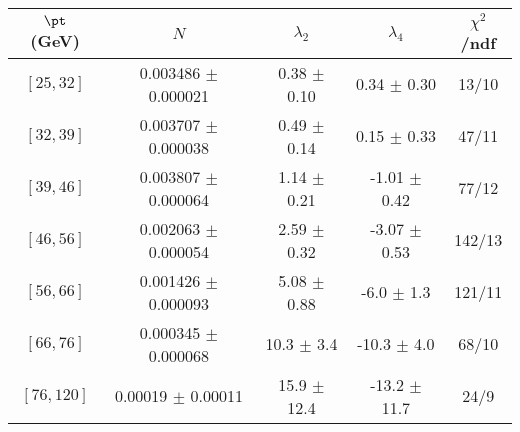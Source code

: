 \begin{tabular}{c||c|c|c|c}
$\pt$ (GeV) & $N$ & $\lambda_{2}$ & $\lambda_4$  & $\chi^2$/ndf  \\
\hline
$[25, 32]$ & 0.003486 $\pm$ 0.000021 & 0.38 $\pm$ 0.10 & 0.34 $\pm$ 0.30 & 13/10\\
$[32, 39]$ & 0.003707 $\pm$ 0.000038 & 0.49 $\pm$ 0.14 & 0.15 $\pm$ 0.33 & 47/11\\
$[39, 46]$ & 0.003807 $\pm$ 0.000064 & 1.14 $\pm$ 0.21 & -1.01 $\pm$ 0.42 & 77/12\\
$[46, 56]$ & 0.002063 $\pm$ 0.000054 & 2.59 $\pm$ 0.32 & -3.07 $\pm$ 0.53 & 142/13\\
$[56, 66]$ & 0.001426 $\pm$ 0.000093 & 5.08 $\pm$ 0.88 & -6.0 $\pm$ 1.3 & 121/11\\
$[66, 76]$ & 0.000345 $\pm$ 0.000068 & 10.3 $\pm$ 3.4 & -10.3 $\pm$ 4.0 & 68/10\\
$[76, 120]$ & 0.00019 $\pm$ 0.00011 & 15.9 $\pm$ 12.4 & -13.2 $\pm$ 11.7 & 24/9\\
\end{tabular}
